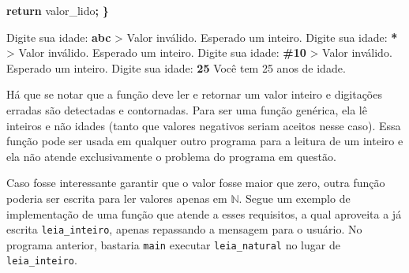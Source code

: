 \documentclass[
  11pt,
  a4paper,
]{scrbook}
\newenvironment{Shaded}{\begin{snugshade}}{\end{snugshade}}
\newcommand{\ControlFlowTok}[1]{\textcolor[rgb]{0.13,0.29,0.53}{\textbf{#1}}}
\newcommand{\KeywordTok}[1]{\textcolor[rgb]{0.13,0.29,0.53}{\textbf{#1}}}
\newcommand{\NormalTok}[1]{#1}
\newcommand{\OperatorTok}[1]{\textcolor[rgb]{0.81,0.36,0.00}{\textbf{#1}}}
\begin{document}
\begin{Shaded}
\begin{Highlighting}[]
    \ControlFlowTok{return}\NormalTok{ valor\_lido}\OperatorTok{;}
\OperatorTok{\}}
\end{Highlighting}
\end{Shaded}

\begin{Shaded}
\begin{Highlighting}[]
\NormalTok{Digite sua idade: }\KeywordTok{ abc }
\NormalTok{\textgreater{} Valor inválido. Esperado um inteiro.}
\NormalTok{Digite sua idade: }\KeywordTok{ * }
\NormalTok{\textgreater{} Valor inválido. Esperado um inteiro.}
\NormalTok{Digite sua idade: }\KeywordTok{ \#10 }
\NormalTok{\textgreater{} Valor inválido. Esperado um inteiro.}
\NormalTok{Digite sua idade: }\KeywordTok{ 25 }
\NormalTok{Você tem 25 anos de idade.}
\end{Highlighting}
\end{Shaded}

Há que se notar que a função deve ler e retornar um valor inteiro e
digitações erradas são detectadas e contornadas. Para ser uma função
genérica, ela lê inteiros e não idades (tanto que valores negativos
seriam aceitos nesse caso). Essa função pode ser usada em qualquer outro
programa para a leitura de um inteiro e ela não atende exclusivamente o
problema do programa em questão.

Caso fosse interessante garantir que o valor fosse maior que zero, outra
função poderia ser escrita para ler valores apenas em \(\mathbb{N}\).
Segue um exemplo de implementação de uma função que atende a esses
requisitos, a qual aproveita a já escrita \texttt{leia\_inteiro}, apenas
repassando a mensagem para o usuário. No programa anterior, bastaria
\texttt{main} executar \texttt{leia\_natural} no lugar de
\texttt{leia\_inteiro}.
\end{document}
